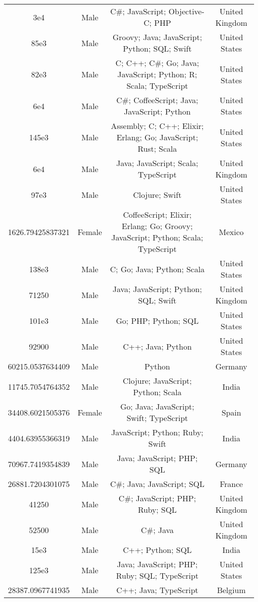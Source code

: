 \begin{center}
\begin{tabular}{ |c|c|c|c| }
3e4  &  Male  &  C\#; JavaScript; Objective-C; PHP  &  United Kingdom  \\ 
85e3  &  Male  &  Groovy; Java; JavaScript; Python; SQL; Swift  &  United States  \\ 
82e3  &  Male  &  C; C++; C\#; Go; Java; JavaScript; Python; R; Scala; TypeScript  &  United States  \\ 
6e4  &  Male  &  C\#; CoffeeScript; Java; JavaScript; Python  &  United States  \\ 
145e3  &  Male  &  Assembly; C; C++; Elixir; Erlang; Go; JavaScript; Rust; Scala  &  United States  \\ 
6e4  &  Male  &  Java; JavaScript; Scala; TypeScript  &  United Kingdom  \\ 
97e3  &  Male  &  Clojure; Swift  &  United States  \\ 
1626.79425837321  &  Female  &  CoffeeScript; Elixir; Erlang; Go; Groovy; JavaScript; Python; Scala; TypeScript  &  Mexico  \\ 
138e3  &  Male  &  C; Go; Java; Python; Scala  &  United States  \\ 
71250  &  Male  &  Java; JavaScript; Python; SQL; Swift  &  United Kingdom  \\ 
101e3  &  Male  &  Go; PHP; Python; SQL  &  United States  \\ 
92900  &  Male  &  C++; Java; Python  &  United States  \\ 
60215.0537634409  &  Male  &  Python  &  Germany  \\ 
11745.7054764352  &  Male  &  Clojure; JavaScript; Python; Scala  &  India  \\ 
34408.6021505376  &  Female  &  Go; Java; JavaScript; Swift; TypeScript  &  Spain  \\ 
4404.63955366319  &  Male  &  JavaScript; Python; Ruby; Swift  &  India  \\ 
70967.7419354839  &  Male  &  Java; JavaScript; PHP; SQL  &  Germany  \\ 
26881.7204301075  &  Male  &  C\#; Java; JavaScript; SQL  &  France  \\ 
41250  &  Male  &  C\#; JavaScript; PHP; Ruby; SQL  &  United Kingdom  \\ 
52500  &  Male  &  C\#; Java  &  United Kingdom  \\ 
15e3  &  Male  &  C++; Python; SQL  &  India  \\ 
125e3  &  Male  &  Java; JavaScript; PHP; Ruby; SQL; TypeScript  &  United States  \\ 
28387.0967741935  &  Male  &  C++; Java; TypeScript  &  Belgium  \\ 

\end{tabular}
\end{center}
